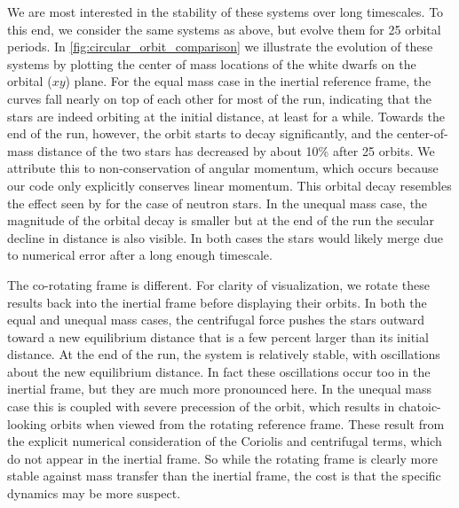 \documentclass[12pt]{article}
\begin{document}


We are most interested in the stability of these systems over long
timescales. To this end, we consider the same systems as above, but
evolve them for 25 orbital periods. In
\autoref{fig:circular_orbit_comparison} we illustrate the evolution of
these systems by plotting the center of mass locations of the white
dwarfs on the orbital ($xy$) plane. For the equal mass case in the
inertial reference frame, the curves fall nearly on top of each
other for most of the run, indicating that the stars are indeed 
orbiting at the initial distance, at least for a while. Towards the end 
of the run, however, the orbit starts to decay significantly, and the center-of-mass
distance of the two stars has decreased by about 10\% after 25 orbits.
We attribute this to non-conservation of angular momentum, which occurs 
because our code only explicitly conserves linear momentum. This orbital 
decay resembles the effect seen by \citet{swc:2000} for the case of neutron stars. 
In the unequal mass case, the magnitude of the orbital decay is smaller but 
at the end of the run the secular decline in distance is also visible. In 
both cases the stars would likely merge due to numerical error 
after a long enough timescale.

The co-rotating frame is different.  For clarity of visualization, we
rotate these results back into the inertial frame before displaying
their orbits.  In both the equal and unequal mass cases, the centrifugal force 
pushes the stars outward toward a new equilibrium distance that is a few 
percent larger than its initial distance. At the end of the run, the system is 
relatively stable, with oscillations about the new equilibrium distance. In fact 
these oscillations occur too in the inertial frame, but they are much more pronounced 
here. In the unequal mass case this is coupled with severe precession of the orbit, 
which results in chatoic-looking orbits when viewed from the rotating reference frame. 
These result from the explicit numerical consideration of the Coriolis and centrifugal 
terms, which do not appear in the inertial frame. So while the rotating frame 
is clearly more stable against mass transfer than the inertial frame,
the cost is that the specific dynamics may be more suspect.
\end{document}
